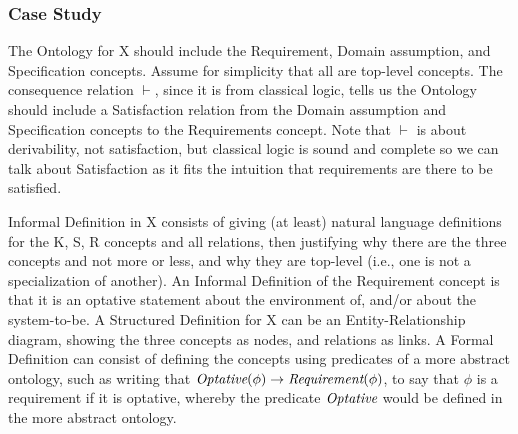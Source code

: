\documentclass[10pt, final, conference, compsocconf]{IEEEtran}
\begin{document}
\subsubsection{Case Study}
The Ontology for X should include the Requirement, Domain assumption, and Specification concepts. Assume for simplicity that all are top-level concepts. The consequence relation $\vdash$, since it is from classical logic, tells us the Ontology should include a Satisfaction relation from the Domain assumption and Specification concepts to the Requirements concept. Note that $\vdash$ is about derivability, not satisfaction, but classical logic is sound and complete so we can talk about Satisfaction as it fits the intuition that requirements are there to be satisfied. 

Informal Definition in X consists of giving (at least) natural language definitions for the K, S, R concepts and all relations, then justifying why there are the three concepts and not more or less, and why they are top-level (i.e., one is not a specialization of another). An Informal Definition of the Requirement concept is that it is an optative statement about the environment of, and/or about the system-to-be. A Structured Definition for X can be an Entity-Relationship diagram, showing the three concepts as nodes, and relations as links. A Formal Definition can consist of defining the concepts using predicates of a more abstract ontology, such as writing that $\textit{Optative}(\phi) \rightarrow \textit{Requirement}(\phi)$, to say that $\phi$ is a requirement if it is optative, whereby the predicate $\textit{Optative}$ would be defined in the more abstract ontology. 

\end{document}
